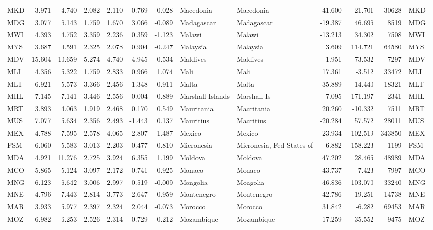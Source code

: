 \begin{tabular}{lrrrrrrllrrrl}
MKD & 3.971 & 4.740 & 2.082 & 2.110 & 0.769 & 0.028 & Macedonia & Macedonia & 41.600 & 21.701 & 30628 & MKD \\
MDG & 3.077 & 6.143 & 1.759 & 1.670 & 3.066 & -0.089 & Madagascar & Madagascar & -19.387 & 46.696 & 8519 & MDG \\
MWI & 4.393 & 4.752 & 3.359 & 2.236 & 0.359 & -1.123 & Malawi & Malawi & -13.213 & 34.302 & 7508 & MWI \\
MYS & 3.687 & 4.591 & 2.325 & 2.078 & 0.904 & -0.247 & Malaysia & Malaysia & 3.609 & 114.721 & 64580 & MYS \\
MDV & 15.604 & 10.659 & 5.274 & 4.740 & -4.945 & -0.534 & Maldives & Maldives & 1.951 & 73.532 & 7297 & MDV \\
MLI & 4.356 & 5.322 & 1.759 & 2.833 & 0.966 & 1.074 & Mali & Mali & 17.361 & -3.512 & 33472 & MLI \\
MLT & 6.921 & 5.573 & 3.366 & 2.456 & -1.348 & -0.911 & Malta & Malta & 35.889 & 14.440 & 18321 & MLT \\
MHL & 7.145 & 7.141 & 3.446 & 2.556 & -0.004 & -0.889 & Marshall Islands & Marshall Is & 7.095 & 171.197 & 2341 & MHL \\
MRT & 3.893 & 4.063 & 1.919 & 2.468 & 0.170 & 0.549 & Mauritania & Mauritania & 20.260 & -10.332 & 7511 & MRT \\
MUS & 7.077 & 5.634 & 2.356 & 2.493 & -1.443 & 0.137 & Mauritius & Mauritius & -20.284 & 57.572 & 28011 & MUS \\
MEX & 4.788 & 7.595 & 2.578 & 4.065 & 2.807 & 1.487 & Mexico & Mexico & 23.934 & -102.519 & 343850 & MEX \\
FSM & 6.060 & 5.583 & 3.013 & 2.203 & -0.477 & -0.810 & Micronesia & Micronesia, Fed States of & 6.882 & 158.223 & 1199 & FSM \\
MDA & 4.921 & 11.276 & 2.725 & 3.924 & 6.355 & 1.199 & Moldova & Moldova & 47.202 & 28.465 & 48989 & MDA \\
MCO & 5.865 & 5.124 & 3.097 & 2.172 & -0.741 & -0.925 & Monaco & Monaco & 43.737 & 7.423 & 7997 & MCO \\
MNG & 6.123 & 6.642 & 3.006 & 2.997 & 0.519 & -0.009 & Mongolia & Mongolia & 46.836 & 103.070 & 33240 & MNG \\
MNE & 4.796 & 7.443 & 2.814 & 3.773 & 2.647 & 0.959 & Montenegro & Montenegro & 42.786 & 19.251 & 14738 & MNE \\
MAR & 3.933 & 5.977 & 2.397 & 2.324 & 2.044 & -0.073 & Morocco & Morocco & 31.842 & -6.282 & 69453 & MAR \\
MOZ & 6.982 & 6.253 & 2.526 & 2.314 & -0.729 & -0.212 & Mozambique & Mozambique & -17.259 & 35.552 & 9475 & MOZ \\

\end{tabular}

